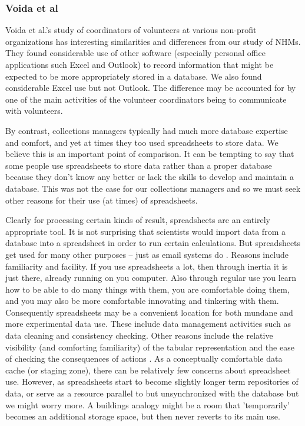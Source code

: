 \subsubsection{Voida et al}

Voida et al.'s study of coordinators of volunteers at various non-profit organizations \cite{voida2011homebrew} has interesting similarities and differences from our study of NHMs. They found considerable use of other software (especially personal office applications such Excel and Outlook) to record information that might be expected to be more appropriately stored in a database. We also found considerable Excel use but not Outlook. The difference may be accounted for by one of the main activities of the volunteer coordinators being to communicate with volunteers. 

By contrast, collections managers typically had much more database expertise and comfort, and yet at times they too used spreadsheets to store data. We believe this is an important point of comparison. It can be tempting to say that some people use spreadsheets to store data rather than a proper database because they don't know any better or lack the skills to develop and maintain a database. This was not the case for our collections managers and so we must seek other reasons for their use (at times) of spreadsheets.

Clearly for processing certain kinds of result, spreadsheets are an entirely appropriate tool. It is not surprising that scientists would import data from a database into a spreadsheet in order to run certain calculations. But spreadsheets get used for many other purposes – just as email systems do \cite{bellotti2005quality}. Reasons include familiarity and facility. If you use spreadsheets a lot, then through inertia it is just there, already running on you computer. Also through regular use you learn how to be able to do many things with them, you are comfortable doing them, and you may also be more comfortable innovating and tinkering with them.  Consequently spreadsheets may be a convenient location for both mundane and more experimental data use. These include data management activities such as data cleaning and consistency checking.  Other reasons include the relative visibility (and comforting familiarity) of the tabular representation and the ease of checking the consequences of actions \cite{nardi1991twinkling}. As a conceptually comfortable data cache (or staging zone), there can be relatively few concerns about spreadsheet use. However, as spreadsheets start to become slightly longer term repositories of data, or serve as a resource parallel to but unsynchronized with the database but  we might worry more. A buildings analogy might be a room that 'temporarily' becomes an additional storage space, but then never reverts to its main use.

